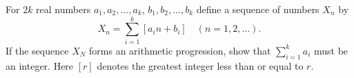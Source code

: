 For $2k$ real numbers $a_1, a_2,\ldots, a_k$, $b_1, b_2,\ldots, b_k$ define a sequence of numbers $X_n$ by \[X_n = \sum_{i=1}^k [a_in + b_i] \quad (n=1,2,\ldots).\] If the sequence $X_N$ forms an arithmetic progression, show that $\textstyle\sum_{i=1}^k a_i$ must be an integer.  Here $[r]$ denotes the greatest integer less than or equal to $r$.